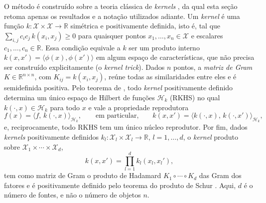 O método é construído sobre a teoria clássica de \textit{kernels} \citep{Aronszajn1950, Scholkopf2001}, da qual esta seção retoma apenas os resultados e a notação utilizados adiante. Um \textit{kernel} é uma função $k: \mathcal{X} \times \mathcal{X} \to \mathbb{R}$ simétrica e positivamente definida, isto é, tal que $\sum_{i,j} c_i c_j\, k(x_i, x_j) \geq 0$ para quaisquer pontos $x_1, \dots, x_n \in \mathcal{X}$ e escalares $c_1, \dots, c_n \in \mathbb{R}$. Essa condição equivale a $k$ ser um produto interno $k(x, x') = \langle \phi(x), \phi(x') \rangle$ em algum espaço de características, que não precisa ser construído explicitamente (o \textit{kernel trick}). \label{def:gram}Dados $n$ pontos, a \emph{matriz de Gram} $K \in \mathbb{R}^{n \times n}$, com $K_{ij} = k(x_i, x_j)$, reúne todas as similaridades entre eles e é semidefinida positiva. Pelo teorema de \cite{Aronszajn1950}, todo \textit{kernel} positivamente definido determina um único espaço de Hilbert de funções $\mathcal{H}_k$ (RKHS) no qual $k(\cdot, x) \in \mathcal{H}_k$ para todo $x$ e vale a propriedade reprodutora
\begin{equation}\label{eq:reproducing}
    f(x) = \langle f, \, k(\cdot, x) \rangle_{\mathcal{H}_k}, \qquad \text{em particular,} \qquad k(x, x') = \langle k(\cdot, x), \, k(\cdot, x') \rangle_{\mathcal{H}_k},
\end{equation}
e, reciprocamente, todo RKHS tem um único núcleo reprodutor. Por fim, dados \textit{kernels} positivamente definidos $k_l: \mathcal{X}_l \times \mathcal{X}_l \to \mathbb{R}$, $l = 1, \dots, d$, o \textit{kernel} produto sobre $\mathcal{X}_1 \times \cdots \times \mathcal{X}_d$,
\begin{equation}\label{eq:kernel_prod}
    k(x, x') = \prod_{l=1}^{d} k_l(x_l, x_l'),
\end{equation}
tem como matriz de Gram o produto de Hadamard $K_1 \circ \cdots \circ K_d$ das Gram dos fatores e é positivamente definido pelo teorema do produto de Schur \citep{Schur1911, HornJohnson2013}. Aqui, $d$ é o número de fontes, e não o número de objetos $n$.
